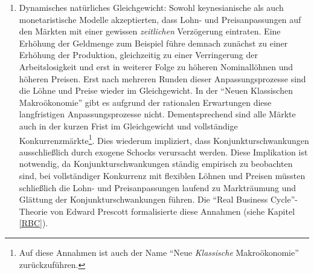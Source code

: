 \begin{enumerate}
	Diese beiden Beispiele zeigen den enormen Nebeneffekt der Rationalen Erwartungen: Nämlich, dass weder Fiskalpolitik noch Geldpolitik\footnote{Nur wenn die politischen Handlungen absolut unvorhergesehen erfolgen, können damit kurzfristig der erwünschte Effekt eintreten.}, einen stabilisierenden Einfluss auf die gesamtwirtschaftliche Entwicklung haben \parencite{Sargent1975, Barro1976}. Wirtschaftspolitik \textit{steuert} nicht länger die ökonomische Entwicklung, sondern ist nur ein \textit{Player} in einem Spiel zwischen Politik und den Markteilnehmern \parencite{Kydland1977}. Dies brachte die Spieltheorie in die Makroökonomie, was ebenfalls dem Zeitgeist entsprach und die Neue Klassische Makroökonomie noch "`sexier"' machte.	
	Abgesehen davon ist dies aber natürlich auch der absolute Bruch mit den Lehren des Keynesianismus.
	Die Wirkungslosigkeit jeglicher damals bekannter wirtschaftspolitischer Elemente, führt uns direkt zum zweiten wesentlichen Punkt der Neuen Klassischen Makroökonomie.
	
	\item Dynamisches natürliches Gleichgewicht: Sowohl keynesianische als auch monetaristische Modelle akzeptierten, dass Lohn- und Preisanpassungen auf den Märkten mit einer gewissen \textit{zeitlichen} Verzögerung eintraten. Eine Erhöhung der Geldmenge zum Beispiel führe demnach zunächst zu einer Erhöhung der Produktion, gleichzeitig zu einer Verringerung der Arbeitslosigkeit und erst in weiterer Folge zu höheren Nominallöhnen und höheren Preisen. Erst nach mehreren Runden dieser Anpassungsprozesse sind die Löhne und Preise wieder im Gleichgewicht.
	In der "`Neuen Klassischen Makroökonomie"' gibt es aufgrund der rationalen Erwartungen diese langfristigen Anpassungsprozesse nicht. Dementsprechend sind alle Märkte auch in der kurzen Frist im Gleichgewicht und vollständige Konkurrenzmärkte\footnote{Auf diese Annahmen ist auch der Name "`Neue \textit{Klassische} Makroökonomie"' zurückzuführen.}. 
	Dies wiederum impliziert, dass Konjunkturschwankungen ausschließlich durch exogene Schocks verursacht werden. Diese Implikation ist notwendig, da Konjunkturschwankungen ständig empirisch zu beobachten sind, bei vollständiger Konkurrenz mit flexiblen Löhnen und Preisen müssten schließlich die Lohn- und Preisanpassungen laufend zu Markträumung und Glättung der Konjunkturschwankungen führen. Die "`Real Business Cycle"'-Theorie von Edward Prescott formalisierte diese Annahmen (siehe Kapitel \ref{RBC}).
	

\end{enumerate}
